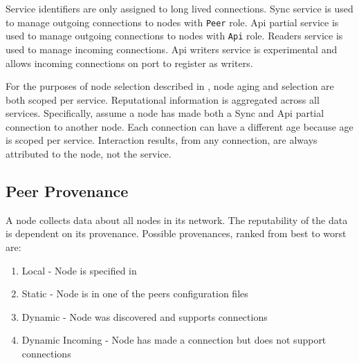 Service identifiers are only assigned to long lived connections.
Sync service is used to manage outgoing connections to nodes with \texttt{Peer} role.
Api partial service is used to manage outgoing connections to nodes with \texttt{Api} role.
Readers service is used to manage incoming connections.
Api writers service is experimental and allows incoming connections on port  to register as writers.

\begin{figure}[H]
	\label{tbl:network:serviceIdentifiers}
\end{figure}

For the purposes of node selection described in , node aging and selection are both scoped per service.
Reputational information is aggregated across all services.
Specifically, assume a node has made both a Sync and Api partial connection to another node.
Each connection can have a different age because age is scoped per service.
Interaction results, from any connection, are always attributed to the node, not the service.

\subsection{Peer Provenance}

A node collects data about all nodes in its network.
The reputability of the data is dependent on its provenance.
Possible provenances, ranked from best to worst are:
\begin{enumerate}
	\item{Local - Node is specified in }
	\item{Static - Node is in one of the peers configuration files}
	\item{Dynamic - Node was discovered and supports connections}
	\item{Dynamic Incoming - Node has made a connection but does not support connections}
\end{enumerate}

